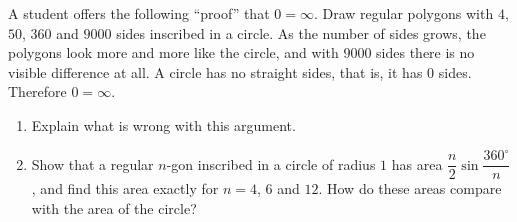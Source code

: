 A student offers the following ``proof'' that $0=\infty$. Draw regular polygons with $4$, $50$, $360$ and $9000$ sides inscribed in a circle. As the number of sides grows, the polygons look more and more like the circle, and with $9000$ sides there is no visible difference at all. A circle has no straight sides, that is, it has $0$ sides. Therefore $0=\infty$.
\begin{enumerate}
\item[(a)] Explain what is wrong with this argument.
\item[(b)] Show that a regular $n$-gon inscribed in a circle of radius $1$ has area $\dfrac {n}{2}\sin\dfrac{360^\circ}{n}$, and find this area exactly for $n=4$, $6$ and $12$. How do these areas compare with the area of the circle?
\end{enumerate}
